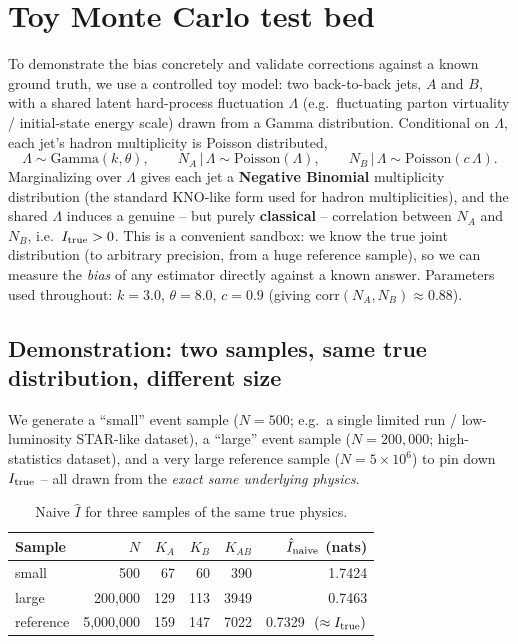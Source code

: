 \documentclass[11pt]{article}
\newcommand{\Itrue}{I_{\rm true}}
\begin{document}
\section{Toy Monte Carlo test bed}
\label{sec:toymc}

To demonstrate the bias concretely and validate corrections against a
known ground truth, we use a controlled toy model: two back-to-back jets,
$A$ and $B$, with a shared latent hard-process fluctuation $\Lambda$
(e.g.\ fluctuating parton virtuality / initial-state energy scale) drawn
from a Gamma distribution. Conditional on $\Lambda$, each jet's hadron
multiplicity is Poisson distributed,
\begin{equation}
\Lambda \sim \mathrm{Gamma}(k,\theta), \qquad
N_A\,|\,\Lambda \sim \mathrm{Poisson}(\Lambda), \qquad
N_B\,|\,\Lambda \sim \mathrm{Poisson}(c\,\Lambda).
\end{equation}
Marginalizing over $\Lambda$ gives each jet a \textbf{Negative Binomial}
multiplicity distribution (the standard KNO-like form used for hadron
multiplicities), and the shared $\Lambda$ induces a genuine -- but purely
\textbf{classical} -- correlation between $N_A$ and $N_B$, i.e.\
$\Itrue>0$. This is a convenient sandbox: we know the true joint
distribution (to arbitrary precision, from a huge reference sample), so we
can measure the \emph{bias} of any estimator directly against a known
answer. Parameters used
throughout: $k=3.0$, $\theta=8.0$, $c=0.9$ (giving
$\mathrm{corr}(N_A,N_B)\approx 0.88$).

\subsection{Demonstration: two samples, same true distribution, different
size}

We generate a ``small'' event sample ($N=500$; e.g.\ a single limited run
/ low-luminosity STAR-like dataset), a ``large'' event sample
($N=200{,}000$; high-statistics dataset), and a very large reference
sample ($N=5\times10^6$) to pin down $\Itrue$ -- all drawn from the
\emph{exact same underlying physics}.

\begin{table}[h]
\centering
\caption{Naive $\hat I$ for three samples of the same true physics.}
\begin{tabular}{lrrrrr}
\toprule
Sample & $N$ & $K_A$ & $K_B$ & $K_{AB}$ & $\hat I_{\rm naive}$ (nats) \\
\midrule
small & 500 & 67 & 60 & 390 & 1.7424 \\
large & 200{,}000 & 129 & 113 & 3949 & 0.7463 \\
reference & 5{,}000{,}000 & 159 & 147 & 7022 & 0.7329 $\;(\approx \Itrue)$ \\
\bottomrule
\end{tabular}
\end{table}
\end{document}
